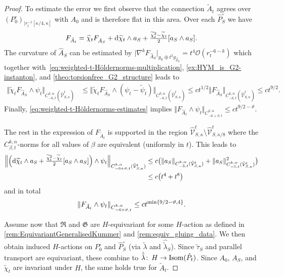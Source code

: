 \documentclass[11pt,a4paper]{scrartcl}
\newcommand*\diff{\mathop{}\!\textup{d}}
\newcommand{\col}{\colon \thinspace}
\newcommand{\VertWHt}[3]{\Vert_{C^{{#1},\alpha}_{{#2},t}{#3}}}
\numberwithin{equation}{section}
\theoremstyle{plain}
\theoremstyle{definition}
\theoremstyle{remark}
\begin{document}
\begin{proof}
To estimate the error we first observe that the connection $\tilde{A}_t$ agrees over $(P_0^\circ)_{\vert r_t^{-1}[\kappa/4,\kappa]}$ with $A_0$ and is therefore flat in this area. Over each $\hat{P}_S^\circ$ we have \[F_{\tilde{A}_t} = \widetilde{\chi}_t F_{\hat{A}_S} + \diff \widetilde{\chi}_t \wedge a_S + \tfrac{\widetilde{\chi}_t^2-\widetilde{\chi}_t}{2} [a_S\wedge a_S]. \] The curvature of $\hat{A}_S$ can be estimated by $\vert \nabla^k F_{\hat{A}_S} \vert_{g_\mathbb{R} \oplus t^2 g_{\hat{Z}_S}} = t^4 \mathcal{O}(r_t^{-6-k}) $ which together with~\eqref{eq:weighted-t-Höldernorms-multiplication}, \autoref{ex:HYM_is_G2-instanton}, and \autoref{theo:torsionfree_G2_structure} leads to 
\begin{align*}
\Vert \widetilde{\chi}_t F_{\hat{A}_S} \wedge \psi_t \VertWHt{k}{-6}{(\hat{\mathcal{V}}^t_{S,\kappa})} &\leq \Vert \widetilde{\chi}_t F_{\hat{A}_S} \wedge (\psi_t-\tilde{\psi}_t) \VertWHt{k}{-6}{(\hat{\mathcal{V}}^t_{S,\kappa})} \leq c t^{1/2} \Vert F_{\hat{A}_S} \VertWHt{k}{-6}{(\hat{\mathcal{V}}^t_{S,\kappa})} \leq c t^{9/2}.
\end{align*}
Finally, \eqref{eq:weighted-t-Höldernorms-estimates} implies $\Vert F_{\hat{A}_t} \wedge \psi_t \VertWHt{k}{-6+\vartheta}{} \leq c t^{9/2-\vartheta}$. 

The rest in the expression of $F_{\tilde{A}_t}$ is supported in the region $\hat{\mathcal{V}}_{S,\kappa}^t\setminus \hat{\mathcal{V}}_{S,\kappa/8}^t$ where the $C^{k,\alpha}_{\beta,t}$-norms for all values of $\beta$ are equivalent (uniformly in $t$). This leads to 
\begin{align*}
\left\Vert \left(\diff \widetilde{\chi}_t \wedge a_S + \tfrac{\widetilde{\chi}_t^2 - \widetilde{\chi}_t}{2}[a_S\wedge a_S]\right) \wedge \psi_t  \right\VertWHt{k}{-6+\vartheta}{(\hat{\mathcal{V}}^t_{S,\kappa})}   & \leq c \big( \Vert a_S \VertWHt{k}{-5}{(\hat{\mathcal{V}}^t_{S,\kappa})} + \Vert a_S \VertWHt{k}{-5}{(\hat{\mathcal{V}}^t_{S,\kappa})}^2 \big) \\
& \leq c \big(t^4+t^8\big)
\end{align*}
and in total \[ \Vert F_{\tilde{A}_t} \wedge \psi_t \VertWHt{k}{-6+\vartheta}{} \leq c t^{\textup{min}\{9/2-\vartheta,4\}}. \] 

Assume now that $\mathfrak{R}$ and $\mathfrak{G}$ are $H$-equivariant for some $H$-action as defined in \autoref{rem:EquivariantGeneralisedKummer} and \autoref{rem:equiv_gluing_data}. We then obtain induced $H$-actions on $P_0^\circ$ and $\hat{P}_S^\circ$ (via $\tilde{\lambda}$ and $\hat{\tilde{\lambda}}_{S}$). Since $\tilde{\tau}_S$ and parallel transport are equivariant, these combine to $\hat{\tilde{\lambda}}\col H \to \textup{Isom}(\hat{P}_t)$. Since $A_0$, $A_S$, and $\tilde{\chi}_t$ are invariant under $H$, the same holds true for $\tilde{A}_t$.
\end{proof}
\end{document}
